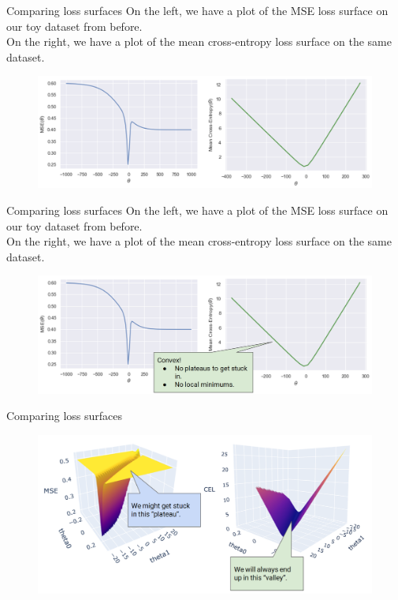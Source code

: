 \documentclass[aspectratio=169]{../latex_main/tntbeamer}  %
\begin{document}
	
	\begin{frame}{Comparing loss surfaces}
	  On the left, we have a plot of the MSE loss surface on our toy dataset from before.\\ On the right, we have a plot of the mean cross-entropy loss surface on the same dataset. 

	    \begin{figure}
	        \centering
	        \includegraphics[scale=.35]{Bild21}
	    \end{figure}
	\end{frame}
	
	
	\begin{frame}{Comparing loss surfaces}
	  On the left, we have a plot of the MSE loss surface on our toy dataset from before.\\ On the right, we have a plot of the mean cross-entropy loss surface on the same dataset. 

	    \begin{figure}
	        \centering
	        \includegraphics[scale=.35]{Bild22}
	    \end{figure}
	\end{frame}
	
	
	\begin{frame}{Comparing loss surfaces}
	    \begin{figure}
	        \centering
	        \includegraphics[scale=.35]{Bild23}
	    \end{figure}
	\end{frame}
	
\end{document}
